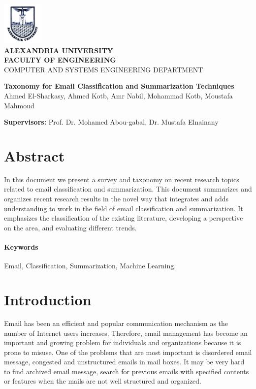\documentclass[12pt]{article}
\begin{document}
\begin{titlepage}
\vspace{-1.5cm}
\begin{center}
\includegraphics[width=2cm]{Logo_Alexandria_University.jpg}\\
\vspace{1cm}
\textbf{\large ALEXANDRIA UNIVERSITY} \\
\textbf{FACULTY OF ENGINEERING} \\
{\small  COMPUTER AND SYSTEMS ENGINEERING DEPARTMENT}

\vspace{2.5cm}
\textbf{\LARGE Taxonomy for Email Classification and Summarization Techniques}\\
\vspace{1cm}
{ Ahmed El-Sharkasy, Ahmed Kotb, Amr Nabil, Mohammad Kotb, Moustafa Mahmoud }
\end{center}

\vspace{1ex}
\textbf{Supervisors:} Prof. Dr. Mohamed Abou-gabal, Dr. Mustafa Elnainany
\end{titlepage}

\newpage
\tableofcontents
\newpage

\section{Abstract}
In this document we present a survey and taxonomy on recent research topics 
related to email classification and summarization. This document summarizes 
and organizes recent research results in the novel way that integrates and 
adds understanding to work in the field of email classification and 
summarization. It emphasizes the classification of the existing literature, 
developing a perspective on the area, and evaluating different trends.

\paragraph{Keywords}
Email, Classification, Summarization, Machine Learning.

\section{Introduction}
Email has been an efficient and popular communication mechanism as the 
number of Internet users increases. Therefore, email management has become 
an important and growing problem for individuals and organizations because 
it is prone to misuse. One of the problems that are most important is disordered 
email message, congested and unstructured emails in mail boxes. It may be very 
hard to find archived email message, search for previous emails with specified 
contents or features when the mails are not well structured and organized.
\end{document}
